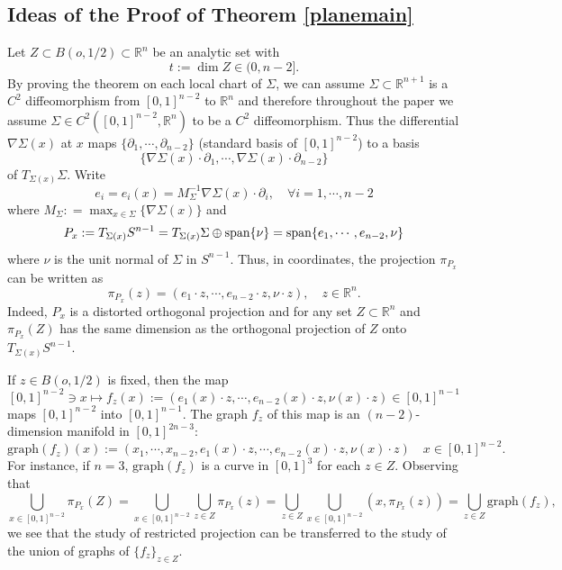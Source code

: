 \documentclass[11pt,a4paper,reqno]{amsart}
\newcommand{\R}{\mathbb{R}}
\newcommand{\1}{\mathbf{1}}
\numberwithin{equation}{section}
\theoremstyle{plain}
\theoremstyle{definition}
\theoremstyle{remark}
\begin{document}
\subsection{Ideas of the Proof of Theorem \ref{planemain}}
Let $Z \subset B(o,1/2) \subset \R^n$ be an analytic set with
$$  t:=\dim Z \in (0,n-2].   $$
By proving the theorem on each local chart of $\Sigma$, we can assume $\Sigma \subset \mathbb{R}^{n+1}$ is a $C^2$ diffeomorphism from $[0,1]^{n-2}$ to $\mathbb{R}^{n}$ and therefore throughout the paper we assume $\Sigma \in C^2([0,1]^{n-2}, \mathbb{R}^{n})$ to be a $C^2$ diffeomorphism.
Thus the differential $\nabla \Sigma(x)$ at $x$ maps $\{\partial_1, \cdots, \partial_{n-2}\}$ (standard basis of $[0,1]^{n-2}$) to a basis
$$  \{\nabla \Sigma(x)\cdot\partial_1, \cdots, \nabla \Sigma(x)\cdot\partial_{n-2}\}$$
of $T_{\Sigma(x)}\Sigma$.
Write
\begin{equation}\label{eix}
  e_i=e_i(x)=M_\Sigma^{-1}\nabla \Sigma(x)\cdot\partial_i, \quad \forall  i =1, \cdots, n-2
\end{equation}
where $M_\Sigma: = \max_{x \in \Sigma}\{\nabla \Sigma(x)\}$
and
\begin{equation}\label{nu}
  P_x:=T_{\Sigma(x)}S^{n-1}=T_{\Sigma(x)}\Sigma \oplus {\rm span} \{\nu\} = {\rm span} \{e_1, \cdots, e_{n-2}, \nu\}
\end{equation}
where $\nu$ is the unit normal of $\Sigma$ in $S^{n-1}$.
Thus, in coordinates, the projection $\pi_{P_x}$ can be written as
$$  \pi_{P_x}(z)=(e_1\cdot z, \cdots, e_{n-2}\cdot z,  \nu\cdot z), \quad z \in \R^n.$$
Indeed, $P_x$ is a distorted orthogonal projection and for any set $Z\subset \R^n$ and $\pi_{P_x}(Z)$ has the same dimension as the orthogonal projection of $Z$ onto $T_{\Sigma(x)}S^{n-1}$.

If $z \in B(o,1/2)$ is fixed, then the map
\begin{equation}\label{fw}
  [0,1]^{n-2} \ni x \mapsto f_z(x):=(e_1(x)\cdot z, \cdots, e_{n-2}(x)\cdot z,  \nu(x)\cdot z) \in [0,1]^{n-1}
\end{equation}
maps $[0,1]^{n-2}$ into $[0,1]^{n-1}$.
The graph $f_z$ of this map is an $(n-2)$-dimension manifold in $[0,1]^{2n-3}$:
$$ \mbox{graph}(f_z)(x):=(x_1, \cdots, x_{n-2},e_1(x)\cdot z, \cdots, e_{n-2}(x)\cdot z,  \nu(x)\cdot z) \quad x \in [0,1]^{n-2}.$$
For instance, if $n=3$, $\mbox{graph}(f_z)$ is a curve in $[0,1]^3$ for each $z \in Z$.
Observing that
$$ \bigcup_{x \in [0,1]^{n-2}}\pi_{P_x}(Z) = \bigcup_{x \in [0,1]^{n-2}}\bigcup_{z \in Z }\pi_{P_x}(z) = \bigcup_{z \in Z }\bigcup_{x \in [0,1]^{n-2}}(x,\pi_{P_x}(z))=\bigcup_{z \in Z}\mbox{graph}(f_z), $$
we see that the study of restricted projection can be transferred to the study of the union of graphs of $\{f_z\}_{z \in Z}$.
\end{document}
